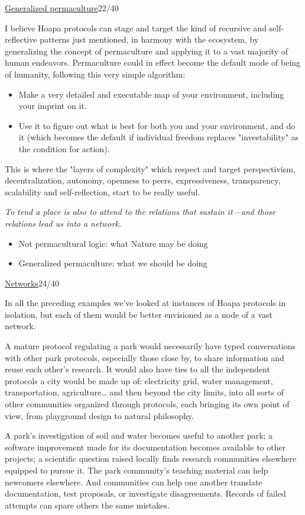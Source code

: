 \documentclass[a4paper,10pt]{article}
\newcommand{\slidehead}[2]{\par\addvspace{7pt}\noindent\underline{#1}\hfill{\color{gray}#2}\par\nopagebreak\vspace{1pt}}
\newcommand{\transition}[1]{\par{\color{black!70}\emph{#1}}\par}
\renewenvironment{leftbar}{%
  \def\FrameCommand{{\color{black!30}\vrule width 1.2pt}\hspace{6pt}}%
  \MakeFramed{\advance\hsize-\width \FrameRestore}}{\endMakeFramed}
\newenvironment{commentary}{\par\vspace{-2pt}\begin{leftbar}\color{black!80}}{\end{leftbar}}
\begin{document}
\slidehead{Generalized permaculture}{22/40}
I believe Hoapa protocols can stage and target the kind of recursive and self-reflective patterns just mentioned, in harmony with the ecosystem, by generalizing the concept of permaculture and applying it to a vast majority of human endeavors. Permaculture could in effect become the default mode of being of humanity, following this very simple algorithm:\par
\begin{itemize}
\item Make a very detailed and executable map of your environment, including your imprint on it.
\item Use it to figure out what is best for both you and your environment, and do it (which becomes the default if individual freedom replaces "investability" as the condition for action).
\end{itemize}
This is where the "layers of complexity" which respect and target perspectivism, decentralization, autonomy, openness to peers, expressiveness, transparency, scalability and self-reflection, start to be really useful.\par
\transition{To tend a place is also to attend to the relations that sustain it—and those relations lead us into a network.}
\begin{commentary}
\begin{itemize}
\item Not permacultural logic: what Nature may be doing
\item Generalized permaculture: what we should be doing
\end{itemize}
\end{commentary}
\slidehead{Networks}{24/40}
In all the preceding examples we've looked at instances of Hoapa protocols in isolation, but each of them would be better envisioned as a node of a vast network.\par
A mature protocol regulating a park would necessarily have typed conversations with other park protocols, especially those close by, to share information and reuse each other's research. It would also have ties to all the independent protocols a city would be made up of: electricity grid, water management, transportation, agriculture… and then beyond the city limits, into all sorts of other communities organized through protocols, each bringing its own point of view, from playground design to natural philosophy.\par
A park’s investigation of soil and water becomes useful to another park; a software improvement made for its documentation becomes available to other projects; a scientific question raised locally finds research communities elsewhere equipped to pursue it. The park community’s teaching material can help newcomers elsewhere. And communities can help one another translate documentation, test proposals, or investigate disagreements. Records of failed attempts can spare others the same mistakes.\par
\end{document}
